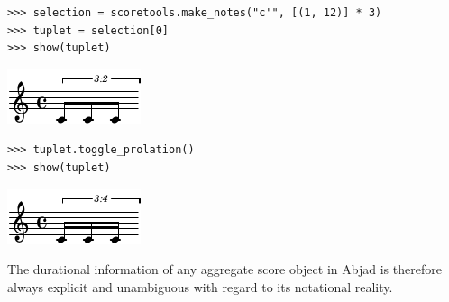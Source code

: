 \begin{lstlisting}
>>> selection = scoretools.make_notes("c'", [(1, 12)] * 3)
>>> tuplet = selection[0]
>>> show(tuplet)
\end{lstlisting}

\includegraphics[scale=1.0]{images/notational_isomorphism-5.pdf}

\begin{lstlisting}
>>> tuplet.toggle_prolation()
>>> show(tuplet)
\end{lstlisting}

\includegraphics[scale=1.0]{images/notational_isomorphism-6.pdf}


The durational information of any aggregate score object in Abjad is therefore
always explicit and unambiguous with regard to its notational reality.